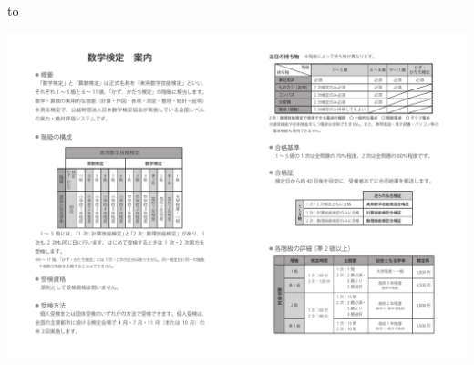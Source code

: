 \documentclass[a5/13QC,dvipdfmx,useotf,uplatex,fleqn,
openany,
]{kbdbook}
\begin{document}
\renewcommand{\theenumi}{\alph{enumi}}%
\renewcommand{\labelenumi}{\theenumi.}%
\frontmatter
\noindent
\hbox{\thispagestyle{empty}}\clearpage
\CopyingRightsText

\begin{center}
\vbox to
\end{center}%
\newpage
\begin{center}
\centering%
\includegraphics[trim=148.5mm 0 0 0,clip]{./KenteiAnnai/KenteiAnnai.pdf}
\end{center}
\newpage
\tableofcontents
\mainmatter
\setcounter{chapter}{-1}










\end{document}
